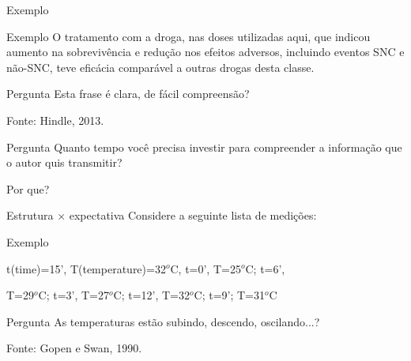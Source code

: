 \documentclass{beamer}
\begin{document}
\begin{frame}{Exemplo}
  \begin{exampleblock}{Exemplo}
    \footnotesize
    O tratamento com a droga, nas doses utilizadas aqui, que
    indicou aumento na sobrevivência e redução nos efeitos adversos,
    incluindo eventos SNC e não-SNC, teve eficácia
    comparável a outras drogas desta classe.
  \end{exampleblock}

  \begin{block}{Pergunta}
    \scriptsize
    Esta frase é clara, de fácil compreensão?
  \end{block}

  \vfill
  \scriptsize
  \hfill Fonte: Hindle, 2013.
\end{frame}

\begin{frame}
  \begin{block}{Pergunta}
    \footnotesize
    Quanto tempo você precisa investir para compreender a informação que o autor quis transmitir?

    \bigskip

    Por que?
  \end{block}
\end{frame}

\begin{frame}{Estrutura $\times$ expectativa}
  Considere a seguinte lista de medições:
  \begin{exampleblock}{Exemplo}
    \scriptsize
    \begin{center}
    t(time)=15', T(temperature)=32$^o$C, t=0', T=25$^o$C; t=6',

    T=29$^o$C; t=3', T=27$^o$C; t=12', T=32$^o$C; t=9'; T=31$^o$C
  \end{center}
  \end{exampleblock}\pause

  \begin{block}{Pergunta}
    As temperaturas estão subindo, descendo, oscilando...?
  \end{block}
  \vfill
  \scriptsize
  \hfill Fonte: Gopen e Swan, 1990.
\end{frame}
\end{document}
